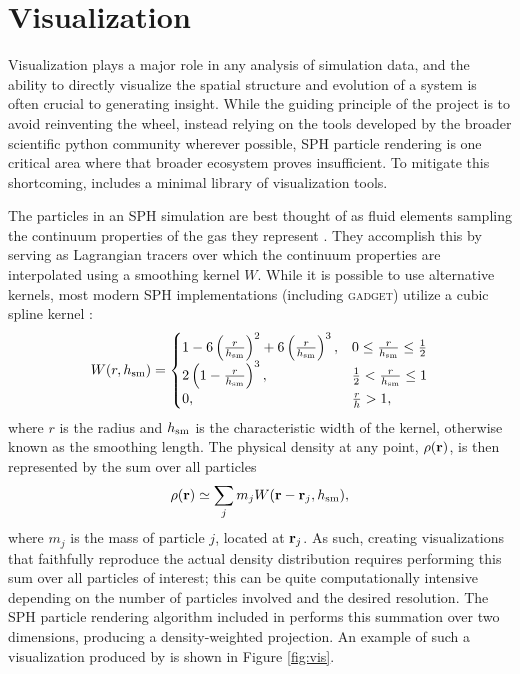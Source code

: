 \section{Visualization}
\label{sec:vis}
Visualization plays a major role in any analysis of simulation data, and the ability to directly visualize the spatial structure and evolution of a system is often crucial to generating insight.
While the guiding principle of the  project is to avoid reinventing the wheel, instead relying on the tools developed by the broader scientific python community wherever possible, SPH particle rendering is one critical area where that broader ecosystem proves insufficient.  
To mitigate this shortcoming,  includes a minimal library of visualization tools.

The particles in an SPH simulation are best thought of as fluid elements sampling the continuum properties of the gas they represent \citep{Lucy1977,GingoldMonaghan1977,Monaghan1992,Springel2010}.  They accomplish this by serving as Lagrangian tracers over which the continuum properties are interpolated using a smoothing kernel $W$. While it is possible to use alternative kernels, most modern SPH implementations (including \textsc{gadget}) utilize a cubic spline kernel \citep{Springel2014}: 
\begin{equation}
W(r,h_{\rm sm}) =
     \begin{cases}
       1 - 6 \left( \frac{r}{h_{\rm sm}} \right)^2 + 6 \left( \frac{r}{h_{\rm sm}} \right)^3, & 0 \leq \frac{r}{h_{\rm sm}} \leq \frac{1}{2}\\
       2 \left(1 - \frac{r}{h_{\rm sm}}\right)^3, & \frac{1}{2} < \frac{r}{h_{\rm sm}} \leq 1\\
       0, & \frac{r}{h} >  1,\\
     \end{cases}
\end{equation}
where $r$ is the radius and $h_{\rm sm}$ is the characteristic width of the kernel, otherwise known as the smoothing length.  The physical density at any point, $\rho(\bf{r})$, is then represented by the sum over all particles
\begin{equation}
\rho({\bf r}) \simeq \sum_j m_j W({\bf r} - {\bf r}_j, h_{\rm sm}),
\end{equation}
where $m_j$ is the mass of particle $j$, located at ${\bf r}_j$.
As such, creating visualizations that faithfully reproduce the actual density distribution requires performing this sum over all particles of interest; this can be quite computationally intensive depending on the number of particles involved and the desired resolution.
The SPH particle rendering algorithm included in  performs this summation over two dimensions, producing a density-weighted projection. An example of such a visualization produced by  is shown in Figure \ref{fig:vis}.

